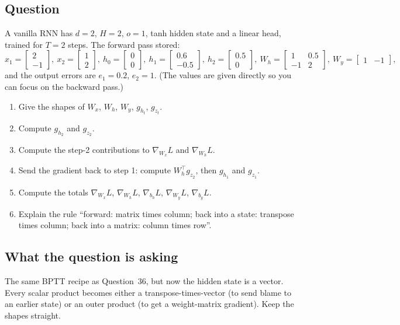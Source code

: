 \documentclass[12pt,a4paper]{article}
\begin{document}
\subsection*{Question}
A vanilla RNN has $d=2$, $H=2$, $o=1$, tanh hidden state and a linear head, trained for $T=2$ steps. The forward pass stored:
\[
x_1=\begin{bmatrix}2\\-1\end{bmatrix},\ x_2=\begin{bmatrix}1\\2\end{bmatrix},\ h_0=\begin{bmatrix}0\\0\end{bmatrix},\ h_1=\begin{bmatrix}0.6\\-0.5\end{bmatrix},\ h_2=\begin{bmatrix}0.5\\0\end{bmatrix},\
W_h=\begin{bmatrix}1&0.5\\-1&2\end{bmatrix},\ W_y=\begin{bmatrix}1&-1\end{bmatrix},
\]
and the output errors are $e_1=0.2$, $e_2=1$. (The values are given directly so you can focus on the backward pass.)
\begin{enumerate}[label=(\alph*)]
\item Give the shapes of $W_x$, $W_h$, $W_y$, $g_{h_t}$, $g_{z_t}$.
\item Compute $g_{h_2}$ and $g_{z_2}$.
\item Compute the step-2 contributions to $\nabla_{W_x}L$ and $\nabla_{W_h}L$.
\item Send the gradient back to step 1: compute $W_h^\top g_{z_2}$, then $g_{h_1}$ and $g_{z_1}$.
\item Compute the totals $\nabla_{W_x}L$, $\nabla_{W_h}L$, $\nabla_{b_h}L$, $\nabla_{W_y}L$, $\nabla_{b_y}L$.
\item Explain the rule ``forward: matrix times column; back into a state: transpose times column; back into a matrix: column times row''.
\end{enumerate}

\subsection*{What the question is asking}
The same BPTT recipe as Question~36, but now the hidden state is a vector. Every scalar product becomes either a transpose-times-vector (to send blame to an earlier state) or an outer product (to get a weight-matrix gradient). Keep the shapes straight.
\end{document}
